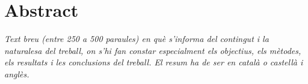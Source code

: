 \chapter*{Abstract}


\textit{Text breu (entre 250 a 500 paraules) en què s'informa del contingut i la naturalesa del treball, on s'hi fan constar especialment els objectius, els mètodes, els resultats i les conclusions del treball. El resum ha de ser en català o castellà i anglès.}